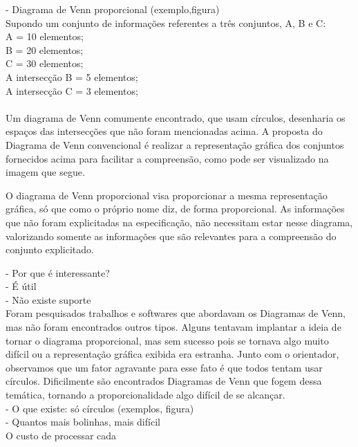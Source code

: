 - Diagrama de Venn proporcional (exemplo,figura)\\
Supondo um conjunto de informações referentes a três conjuntos, A, B e C:\\

A = 10 elementos;\\
B = 20 elementos;\\
C = 30 elementos;\\


A intersecção B = 5 elementos;\\

A intersecção C = 3 elementos;\\
\\


Um diagrama de Venn comumente encontrado, que usam círculos, desenharia os espaços das intersecções que não foram mencionadas acima. A proposta do Diagrama de Venn convencional é realizar a representação gráfica dos conjuntos fornecidos acima para facilitar a compreensão, como pode ser visualizado na imagem que segue.

O diagrama de Venn proporcional visa proporcionar a mesma representação gráfica, só que como o próprio nome diz, de forma proporcional. As informações que não foram explicitadas na especificação, não necessitam estar nesse diagrama, valorizando somente as informações que são relevantes para a compreensão do conjunto explicitado. 


- Por que é interessante?\\
  - É útil\\
  - Não existe suporte\\
Foram pesquisados trabalhos e softwares que abordavam os Diagramas de Venn, mas não foram encontrados outros tipos. Alguns tentavam implantar a ideia de tornar o diagrama proporcional, mas sem sucesso pois se tornava algo muito difícil ou a representação gráfica exibida era estranha. Junto com o orientador, observamos que um fator agravante para esse fato é que todos tentam usar círculos. Dificilmente são encontrados Diagramas de Venn que fogem dessa temática, tornando a proporcionalidade algo difícil de se alcançar. \\

  - O que existe: só círculos (exemplos, figura)\\
  - Quantos mais bolinhas, mais difícil\\
  
  O custo de processar cada 
  
